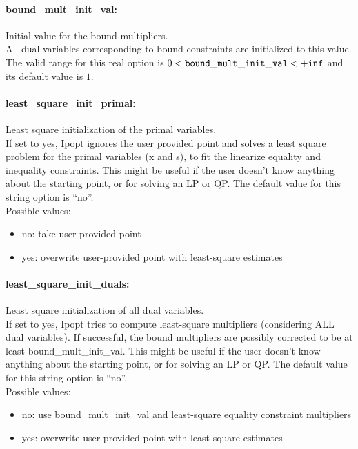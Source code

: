 \paragraph{bound\_mult\_init\_val:} Initial value for the bound multipliers. $\;$ \\
 All dual variables corresponding to bound
constraints are initialized to this value. The valid range for this real option is 
$0 <  {\tt bound\_mult\_init\_val } <  {\tt +inf}$
and its default value is $1$.

\paragraph{least\_square\_init\_primal:} Least square initialization of the primal variables. $\;$ \\
     If set to yes, Ipopt ignores the user provided point and solves a least
     square problem for the primal variables (x and s), to fit the linearize
     equality and inequality constraints.  This might be useful if the user
     doesn't know anything about the starting point, or for solving an LP or
     QP.
The default value for this string option is ``no''.\\
   Possible values:
\begin{itemize}
    \item no:                      take user-provided point
    \item yes:                     overwrite user-provided point with least-square estimates
\end{itemize}

\paragraph{least\_square\_init\_duals:} Least square initialization of all dual variables. $\;$ \\
     If set to yes, Ipopt tries to compute least-square multipliers
     (considering ALL dual variables).  If successful, the bound multipliers
     are possibly corrected to be at least bound\_mult\_init\_val. This might be
     useful if the user doesn't know anything about the starting point, or for
     solving an LP or QP.
The default value for this string option is ``no''.\\
   Possible values:
\begin{itemize}
    \item no:                      use bound\_mult\_init\_val and least-square equality constraint multipliers
    \item yes:                     overwrite user-provided point with least-square estimates
\end{itemize}

